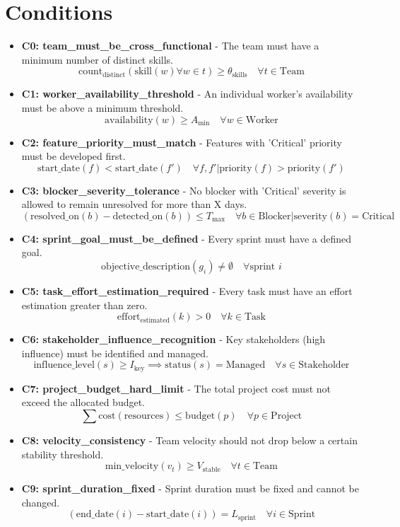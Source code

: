 \documentclass[11pt]{article}
\begin{document}
\section{Conditions}
\begin{itemize}
    \item \textbf{C0: team\_must\_be\_cross\_functional} - The team must have a minimum number of distinct skills.
        \[ \text{count}_{\text{distinct}}(\text{skill}(w) \forall w \in t) \geq \theta_{\text{skills}} \quad \forall t \in \text{Team} \]
    \item \textbf{C1: worker\_availability\_threshold} - An individual worker's availability must be above a minimum threshold.
        \[ \text{availability}(w) \geq A_{\text{min}} \quad \forall w \in \text{Worker} \]
    \item \textbf{C2: feature\_priority\_must\_match} - Features with 'Critical' priority must be developed first.
        \[ \text{start\_date}(f) < \text{start\_date}(f') \quad \forall f, f' | \text{priority}(f) > \text{priority}(f') \]
    \item \textbf{C3: blocker\_severity\_tolerance} - No blocker with 'Critical' severity is allowed to remain unresolved for more than X days.
        \[ (\text{resolved\_on}(b) - \text{detected\_on}(b)) \leq T_{\text{max}} \quad \forall b \in \text{Blocker} | \text{severity}(b) = \text{Critical} \]
    \item \textbf{C4: sprint\_goal\_must\_be\_defined} - Every sprint must have a defined goal.
        \[ \text{objective\_description}(g_i) \neq \emptyset \quad \forall \text{sprint } i \]
    \item \textbf{C5: task\_effort\_estimation\_required} - Every task must have an effort estimation greater than zero.
        \[ \text{effort}_{\text{estimated}}(k) > 0 \quad \forall k \in \text{Task} \]
    \item \textbf{C6: stakeholder\_influence\_recognition} - Key stakeholders (high influence) must be identified and managed.
        \[ \text{influence\_level}(s) \geq I_{\text{key}} \implies \text{status}(s) = \text{Managed} \quad \forall s \in \text{Stakeholder} \]
    \item \textbf{C7: project\_budget\_hard\_limit} - The total project cost must not exceed the allocated budget.
        \[ \sum \text{cost}(\text{resources}) \leq \text{budget}(p) \quad \forall p \in \text{Project} \]
    \item \textbf{C8: velocity\_consistency} - Team velocity should not drop below a certain stability threshold.
        \[ \text{min\_velocity}(v_t) \geq V_{\text{stable}} \quad \forall t \in \text{Team} \]
    \item \textbf{C9: sprint\_duration\_fixed} - Sprint duration must be fixed and cannot be changed.
        \[ (\text{end\_date}(i) - \text{start\_date}(i)) = L_{\text{sprint}} \quad \forall i \in \text{Sprint} \]
\end{itemize}
\end{document}
